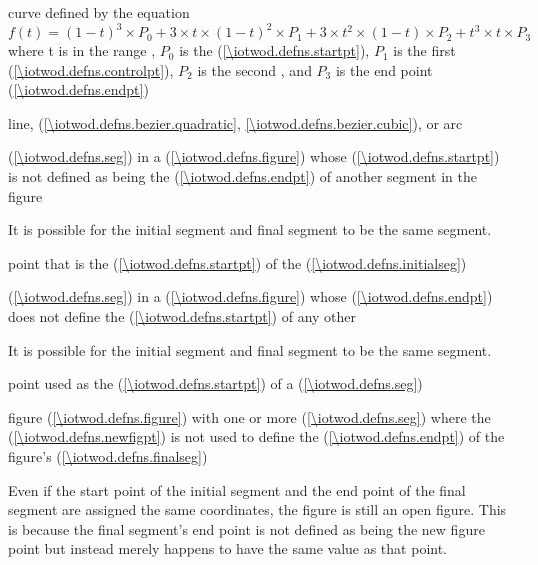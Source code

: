  curve defined by the 
equation $f(t) = (1 - t)^{3} \times P_{0} + 3 \times t \times (1 - t)^{2} 
\times P_{1} + 3 \times t^{2} \times (1 - t) \times P_{2} + t^{3} \times t 
\times P_{3}$ where t is in the range , $P_{0}$ is the  (\ref{\iotwod.defns.startpt}), $P_{1}$ is the first  (\ref{\iotwod.defns.controlpt}), $P_{2}$ is the second , and $P_{3}$ is the end point (\ref{\iotwod.defns.endpt})

%
line,  (\ref{\iotwod.defns.bezier.quadratic}, \ref{\iotwod.defns.bezier.cubic}), or arc

%
 (\ref{\iotwod.defns.seg}) in a  (\ref{\iotwod.defns.figure}) whose  (\ref{\iotwod.defns.startpt}) is not defined as being the  (\ref{\iotwod.defns.endpt}) of another segment in the figure
\begin{note}
It is possible for the initial segment and final segment to be the same segment.
\end{note}

%
point that is the  (\ref{\iotwod.defns.startpt}) of the  (\ref{\iotwod.defns.initialseg})

%
 (\ref{\iotwod.defns.seg}) in a  (\ref{\iotwod.defns.figure}) whose  (\ref{\iotwod.defns.endpt}) does not define the  (\ref{\iotwod.defns.startpt}) of any other 
\begin{note}
It is possible for the initial segment and final segment to be the same segment.
\end{note}

%
point used as the  (\ref{\iotwod.defns.startpt}) of a  (\ref{\iotwod.defns.seg})

%
figure (\ref{\iotwod.defns.figure}) with one or more  (\ref{\iotwod.defns.seg}) where the  (\ref{\iotwod.defns.newfigpt}) is not used to define the  (\ref{\iotwod.defns.endpt}) of the figure's  (\ref{\iotwod.defns.finalseg})
\begin{note}
Even if the start point of the initial segment and the end point of the final segment are assigned the same coordinates, the figure is still an open figure. This is because the final segment's end point is not defined as being the new figure point but instead merely happens to have the same value as that point.
\end{note}

